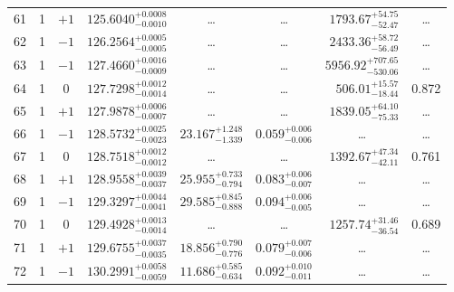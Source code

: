 \begin{table*}[!]
\begin{tabular}{llcrrlrc}
61 & 1 & $+1$ & $    125.6040_{-      0.0010}^{+      0.0008}$ & \multicolumn{1}{c}{\dots} & \multicolumn{1}{c}{\dots} & $     1793.67_{-       52.47}^{+       54.75}$ & \dots \\[1pt]
62 & 1 & $-1$ & $    126.2564_{-      0.0005}^{+      0.0005}$ & \multicolumn{1}{c}{\dots} & \multicolumn{1}{c}{\dots} & $     2433.36_{-       56.49}^{+       58.72}$ & \dots \\[1pt]
63 & 1 & $-1$ & $    127.4660_{-      0.0009}^{+      0.0016}$ & \multicolumn{1}{c}{\dots} & \multicolumn{1}{c}{\dots} & $     5956.92_{-      530.06}^{+      707.65}$ & \dots \\[1pt]
64 & 1 & 0 & $    127.7298_{-      0.0014}^{+      0.0012}$ & \multicolumn{1}{c}{\dots} & \multicolumn{1}{c}{\dots} & $      506.01_{-       18.44}^{+       15.57}$ & 0.872\\[1pt]
65 & 1 & $+1$ & $    127.9878_{-      0.0007}^{+      0.0006}$ & \multicolumn{1}{c}{\dots} & \multicolumn{1}{c}{\dots} & $     1839.05_{-       75.33}^{+       64.10}$ & \dots \\[1pt]
66 & 1 & $-1$ & $    128.5732_{-      0.0023}^{+      0.0025}$ & $      23.167_{-       1.339}^{+       1.248}$ & $       0.059_{-       0.006}^{+       0.006}$ & \multicolumn{1}{c}{\dots} & \dots \\[1pt]
67 & 1 & 0 & $    128.7518_{-      0.0012}^{+      0.0012}$ & \multicolumn{1}{c}{\dots} & \multicolumn{1}{c}{\dots} & $     1392.67_{-       42.11}^{+       47.34}$ & 0.761\\[1pt]
68 & 1 & $+1$ & $    128.9558_{-      0.0037}^{+      0.0039}$ & $      25.955_{-       0.794}^{+       0.733}$ & $       0.083_{-       0.007}^{+       0.006}$ & \multicolumn{1}{c}{\dots} & \dots \\[1pt]
69 & 1 & $-1$ & $    129.3297_{-      0.0041}^{+      0.0044}$ & $      29.585_{-       0.888}^{+       0.845}$ & $       0.094_{-       0.005}^{+       0.006}$ & \multicolumn{1}{c}{\dots} & \dots \\[1pt]
70 & 1 & 0 & $    129.4928_{-      0.0014}^{+      0.0013}$ & \multicolumn{1}{c}{\dots} & \multicolumn{1}{c}{\dots} & $     1257.74_{-       36.54}^{+       31.46}$ & 0.689 \\[1pt]
71 & 1 & $+1$ & $    129.6755_{-      0.0035}^{+      0.0037}$ & $      18.856_{-       0.776}^{+       0.790}$ & $       0.079_{-       0.006}^{+       0.007}$ & \multicolumn{1}{c}{\dots} & \dots \\[1pt]
72 & 1 & $-1$ & $    130.2991_{-      0.0059}^{+      0.0058}$ & $      11.686_{-       0.634}^{+       0.585}$ & $       0.092_{-       0.011}^{+       0.010}$ & \multicolumn{1}{c}{\dots} & \dots \\[1pt]

\end{tabular}
\end{table*}
